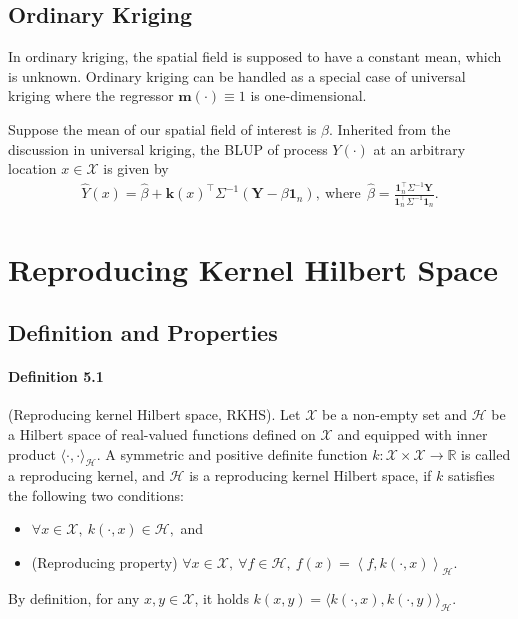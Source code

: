 \documentclass{article}
\begin{document}
\subsection{Ordinary Kriging}
In ordinary kriging, the spatial field is supposed to have a constant mean, which is unknown. Ordinary kriging can be handled as a special case of universal kriging where the regressor $\mathbf{m}(\cdot)\equiv 1$ is one-dimensional. 

Suppose the mean of our spatial field of interest is $\beta.$ Inherited from the discussion in universal kriging, the BLUP of process $Y(\cdot)$ at an arbitrary location $x\in\mathcal{X}$ is given by
\begin{align*}
	\hat{Y}(x) = \hat{\beta} + \mathbf{k}(x)^\top\Sigma^{-1}(\mathbf{Y} - \beta\mathbf{1}_n),\ \text{where}\ \ \hat{\beta} = \frac{\mathbf{1}_n^\top \Sigma^{-1}\mathbf{Y}}{\mathbf{1}_n^\top \Sigma^{-1}\mathbf{1}_n}.\tag{4.41}
\end{align*}

\newpage

\section{Reproducing Kernel Hilbert Space}
\subsection{Definition and Properties}
\paragraph{Definition 5.1} (Reproducing kernel Hilbert space, RKHS). Let $\mathcal{X}$ be a non-empty set and $\mathcal{H}$ be a Hilbert space of real-valued functions defined on $\mathcal{X}$ and equipped with inner product $\langle\cdot,\cdot\rangle_\mathcal{H}$. A symmetric and positive definite function $k:\mathcal{X}\times\mathcal{X}\to\mathbb{R}$ is called a reproducing kernel, and $\mathcal{H}$ is a reproducing kernel Hilbert space, if $k$ satisfies the following two conditions:
\begin{itemize}
	\item $\forall x\in\mathcal{X},\ k(\cdot,x)\in\mathcal{H},$ and
	\item (Reproducing property) $\forall x\in\mathcal{X},\ \forall f\in\mathcal{H},\ f(x)=\left\langle f,k(\cdot,x) \right\rangle_\mathcal{H}.$
\end{itemize}
By definition, for any $x,y\in\mathcal{X}$, it holds $k(x,y)=\langle k(\cdot, x),k(\cdot,y)\rangle_\mathcal{H}$.
\end{document}
